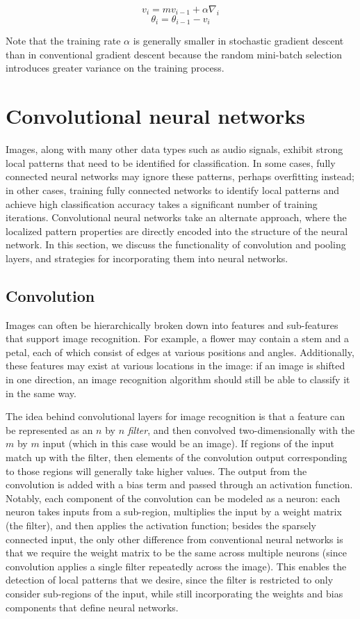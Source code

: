 \documentclass[10pt,twocolumn]{article}
\begin{document}
$$v_i = mv_{i-1} + \alpha \nabla_i$$
$$\theta_i = \theta_{i-1} - v_i$$

Note that the training rate $\alpha$ is generally smaller in stochastic gradient descent than in conventional gradient descent because the random mini-batch selection introduces greater variance on the training process.

\section{Convolutional neural networks} \label{sec:cnn}

Images, along with many other data types such as audio signals, exhibit strong local patterns that need to be identified for classification. In some cases, fully connected neural networks may ignore these patterns, perhaps overfitting instead; in other cases, training fully connected networks to identify local patterns and achieve high classification accuracy takes a significant number of training iterations. Convolutional neural networks take an alternate approach, where the localized pattern properties are directly encoded into the structure of the neural network. In this section, we discuss the functionality of convolution and pooling layers, and strategies for incorporating them into neural networks.

\subsection{Convolution}

Images can often be hierarchically broken down into features and sub-features that support image recognition. For example, a flower may contain a stem and a petal, each of which consist of edges at various positions and angles. Additionally, these features may exist at various locations in the image: if an image is shifted in one direction, an image recognition algorithm should still be able to classify it in the same way.

The idea behind convolutional layers for image recognition is that a feature can be represented as an $n$ by $n$ \emph{filter}, and then convolved two-dimensionally with the $m$ by $m$ input (which in this case would be an image). If regions of the input match up with the filter, then elements of the convolution output corresponding to those regions will generally take higher values. The output from the convolution is added with a bias term and passed through an activation function. Notably, each component of the convolution can be modeled as a neuron: each neuron takes inputs from a sub-region, multiplies the input by a weight matrix (the filter), and then applies the activation function; besides the sparsely connected input, the only other difference from conventional neural networks is that we require the weight matrix to be the same across multiple neurons (since convolution applies a single filter repeatedly across the image). This enables the detection of local patterns that we desire, since the filter is restricted to only consider sub-regions of the input, while still incorporating the weights and bias components that define neural networks.
\end{document}
